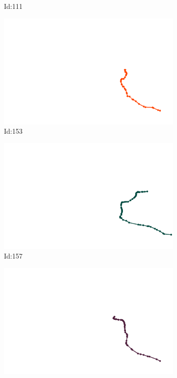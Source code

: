 \documentclass[12pt,twoside]{report}
\begin{document}
\begin{figure}
\begin{subfigure}[b]{0.20\textwidth}
\caption{Id:111}
\end{subfigure}
\begin{subfigure}[b]{0.20\textwidth}
\centering
\includegraphics[width=\textwidth]{../trajectories/153.png}
\caption{Id:153}
\end{subfigure}
\begin{subfigure}[b]{0.20\textwidth}
\centering
\includegraphics[width=\textwidth]{../trajectories/157.png}
\caption{Id:157}
\end{subfigure}
\begin{subfigure}[b]{0.20\textwidth}
\centering
\includegraphics[width=\textwidth]{../trajectories/169.png}

\end{subfigure}
\end{figure}
\end{document}
